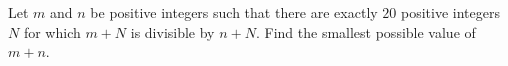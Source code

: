Let $m$ and $n$ be positive integers such that there are exactly $20$ positive integers $N$ for which $m+N$ is divisible by $n+N$. Find the smallest possible value of $m+n$.
